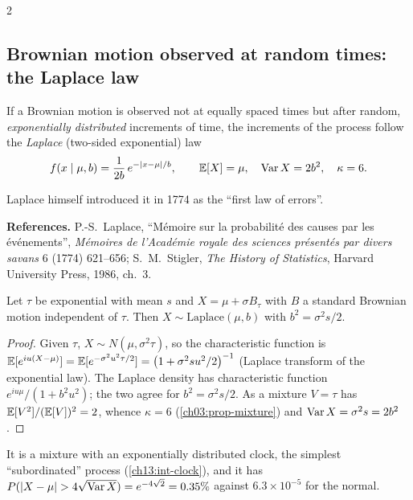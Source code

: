 \begin{paracol}{2}
\subsection{Brownian motion observed at random times: the Laplace law}\label{ch13:sec-laplace}
If a Brownian motion is observed not at equally spaced times but after random, \emph{exponentially distributed} increments of time, the increments of the process follow the
\emph{Laplace} (two-sided exponential) law 
\begin{equation}\label{ch13:eq-laplace}
  f(x\mid\mu,b)=\frac1{2b}\,e^{-|x-\mu|/b},\qquad \mathbb{E}[X]=\mu,\quad \operatorname{Var} X=2b^2,\quad \kappa=6 .
\end{equation}
\begin{history}
Laplace himself introduced it in 1774 as the ``first law of errors''.

\textbf{References.} P.-S.~Laplace, ``Mémoire sur la probabilité des causes par les événements'', \emph{Mémoires de l'Académie royale des sciences présentés par divers savans} 6 (1774) 621--656; S.~M.~Stigler, \emph{The History of Statistics}, Harvard University Press, 1986, ch.~3.
\end{history}

\begin{proposition}\label{ch13:prop-laplace}
Let $\tau$ be exponential with mean $s$ and $X=\mu+\sigma B_\tau$ with $B$ a standard Brownian motion independent of $\tau$. Then $X\sim\mathrm{Laplace}(\mu,b)$ with $b^2=\sigma^2s/2$.
\end{proposition}
\begin{proof}
Given $\tau$, $X\sim N(\mu,\sigma^2\tau)$, so the characteristic function is $\mathbb{E}[e^{iu(X-\mu)}]=\mathbb{E}[e^{-\sigma^2u^2\tau/2}]=\bigl(1+\sigma^2su^2/2\bigr)^{-1}$
(Laplace transform of the exponential law). The Laplace density has characteristic function $e^{iu\mu}/(1+b^2u^2)$; the two agree for $b^2=\sigma^2s/2$. As a mixture
$V=\tau$ has $\mathbb{E}[V^2]/(\mathbb{E}[V])^2=2$, whence $\kappa=6$ (\cref{ch03:prop-mixture}) and $\operatorname{Var} X=\sigma^2s=2b^2$.
\end{proof}
It is a mixture with an exponentially distributed clock, the simplest ``subordinated'' process (\cref{ch13:int-clock}), and it has
$P(|X-\mu|>4\sqrt{\Var X})=e^{-4\sqrt2}=0.35\%$ against $6.3\times10^{-5}$ for the normal.


\end{paracol}
